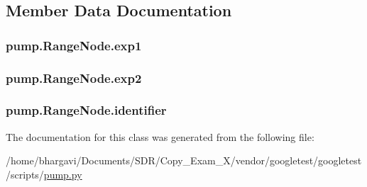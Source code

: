\subsection{Member Data Documentation}
\subsubsection[{\texorpdfstring{exp1}{exp1}}]{\setlength{\rightskip}{0pt plus 5cm}pump.\+Range\+Node.\+exp1}\hypertarget{classpump_1_1_range_node_acbb59f8c5e23d23563ca03f21574ce63}{}\label{classpump_1_1_range_node_acbb59f8c5e23d23563ca03f21574ce63}
\subsubsection[{\texorpdfstring{exp2}{exp2}}]{\setlength{\rightskip}{0pt plus 5cm}pump.\+Range\+Node.\+exp2}\hypertarget{classpump_1_1_range_node_afe153ee472b121652a51c62c1522cc13}{}\label{classpump_1_1_range_node_afe153ee472b121652a51c62c1522cc13}
\subsubsection[{\texorpdfstring{identifier}{identifier}}]{\setlength{\rightskip}{0pt plus 5cm}pump.\+Range\+Node.\+identifier}\hypertarget{classpump_1_1_range_node_ae75b9f31ba8c3bd048cf09b22035efa0}{}\label{classpump_1_1_range_node_ae75b9f31ba8c3bd048cf09b22035efa0}


The documentation for this class was generated from the following file\+:\begin{DoxyCompactItemize}
\item 
/home/bhargavi/\+Documents/\+S\+D\+R/\+Copy\+\_\+\+Exam\+\_\+X/vendor/googletest/googletest/scripts/\hyperlink{pump_8py}{pump.\+py}\end{DoxyCompactItemize}
